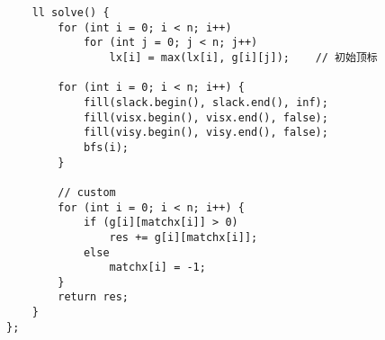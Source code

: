 \begin{verbatim}
    ll solve() {
        for (int i = 0; i < n; i++)
            for (int j = 0; j < n; j++)
                lx[i] = max(lx[i], g[i][j]);    // 初始顶标

        for (int i = 0; i < n; i++) {
            fill(slack.begin(), slack.end(), inf);
            fill(visx.begin(), visx.end(), false);
            fill(visy.begin(), visy.end(), false);
            bfs(i);
        }

        // custom
        for (int i = 0; i < n; i++) {
            if (g[i][matchx[i]] > 0)
                res += g[i][matchx[i]];
            else
                matchx[i] = -1;
        }
        return res;
    }
};
\end{verbatim}